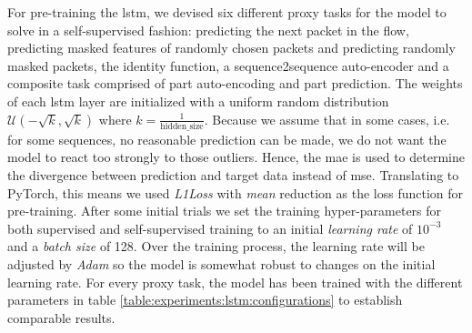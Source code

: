 For pre-training the \gls{lstm}, we devised six different proxy tasks for the model to solve in a self-supervised fashion: predicting the next packet in the flow, predicting masked features of randomly chosen packets and predicting randomly masked packets, the identity function, a sequence2sequence auto-encoder and a composite task comprised of part auto-encoding and part prediction. 
The weights of each \gls{lstm} layer are initialized with a uniform random distribution $\mathcal{U}(-\sqrt{k}, \sqrt{k})$ where $k = \frac{1}{\text{hidden\_size}}$. Because we assume that in some cases, i.e. for some sequences, no reasonable prediction can be made, we do not want the model to react too strongly to those outliers. Hence, the \gls{mae} is used to determine the divergence between prediction and target data instead of \gls{mse}. Translating to PyTorch, this means we used \textit{L1Loss} with \textit{mean} reduction as the loss function for pre-training. After some initial trials we set the training hyper-parameters for both supervised and self-supervised training to an initial \textit{learning rate} of $10^{-3}$ and a \textit{batch size} of 128. Over the training process, the learning rate will be adjusted by \textit{Adam} so the model is somewhat robust to changes on the initial learning rate. For every proxy task, the model has been trained with the different parameters in table \ref{table:experiments:lstm:configurations} to establish comparable results.

